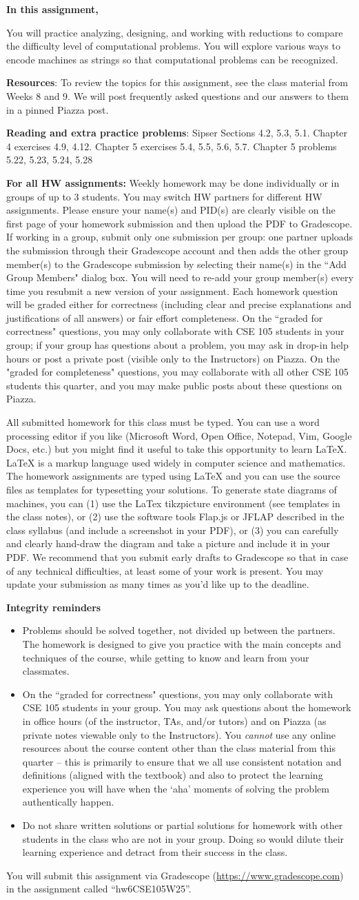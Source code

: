 \documentclass[12pt, oneside]{article}
\newcommand{\instructions}{{\bf For all HW assignments:} Weekly homework 
may be done individually or in groups of up to 3 students. 
You may switch HW partners for different HW assignments. 
Please ensure your name(s) and PID(s) are clearly visible on the first page of your homework submission 
and then upload the PDF to Gradescope. If working in a group, submit only one submission per group: 
one partner uploads the submission through their Gradescope account and then adds the other group member(s) 
to the Gradescope submission by selecting their name(s) in the ``Add Group Members" dialog box. 
You will need to re-add your group member(s) every time you resubmit a new version of your assignment.
 Each homework question will be graded either for correctness (including clear and precise explanations and 
 justifications of all answers) or fair effort completeness. 
 On the ``graded for correctness"
 questions, you may only collaborate with CSE 105 students in your group; if your
 group has questions about a problem, you may ask in drop-in help hours or post a private
post (visible only to the Instructors) on Piazza. On the "graded for completeness" questions, you 
may collaborate with all other CSE 105 students this quarter, and you may make public posts about these questions 
on Piazza.

All submitted homework for this class must be typed. 
You can use a word processing editor if you like (Microsoft Word, Open Office, Notepad, Vim, Google Docs, etc.) 
but you might find it useful to take this opportunity to learn LaTeX. 
LaTeX is a markup language used widely in computer science and mathematics. 
The homework assignments are typed using LaTeX and you can use the source files 
as templates for typesetting your solutions.
To generate state diagrams of machines, you can (1) use the LaTex tikzpicture
environment (see templates in the class notes), or (2) use the software tools Flap.js or
JFLAP described in the class syllabus (and include a screenshot in your PDF), or (3) you can carefully
and clearly hand-draw
the diagram and take a picture and include it in your PDF.
We recommend that you
submit early drafts to Gradescope so that in case of any technical difficulties, at least some of your
work is present. You may update your submission as many times as you'd like up to the deadline.


{\bf Integrity reminders}
\begin{itemize}
\item Problems should be solved together, not divided up between the partners. The homework is
designed to give you practice with the main concepts and techniques of the course, 
while getting to know and learn from your classmates.
\item On the ``graded for correctness"
questions, you may only collaborate with CSE 105 students in your group.
You may ask questions about the homework in office hours (of the instructor, TAs, and/or tutors) and 
on Piazza (as private notes viewable only to the Instructors).  
You \emph{cannot} use any online resources about the course content other than the class material 
from this quarter -- this is primarily to ensure that we all use consistent notation and
definitions (aligned with the textbook) and also to protect the learning experience you will have when
the `aha' moments of solving the problem authentically happen.
\item Do not share written solutions or partial solutions for homework with 
other students in the class who are not in your group. Doing so would dilute their learning 
experience and detract from their success in the class.
\end{itemize}

}
\begin{document}
\maketitle
\thispagestyle{fancy}

{\bf In this assignment,}

You will  practice analyzing, designing, and working with reductions to compare 
the difficulty level of computational problems.
You will explore various ways to encode machines as strings so that 
computational problems can be recognized.

{\bf Resources}: To review the topics 
for this assignment, see the class material from Weeks 8 and 9.
We will post frequently asked questions and our answers to them in a 
pinned Piazza post. 

{\bf Reading and extra practice problems}:  
Sipser Sections 4.2, 5.3, 5.1.
Chapter 4 exercises 4.9, 4.12.
Chapter 5 exercises 5.4, 5.5, 5.6, 5.7. 
Chapter 5 problems 5.22, 5.23, 5.24, 5.28

\instructions

You will submit this assignment via Gradescope
(\href{https://www.gradescope.com}{https://www.gradescope.com}) 
in the assignment called ``hw6CSE105W25''.
\end{document}

